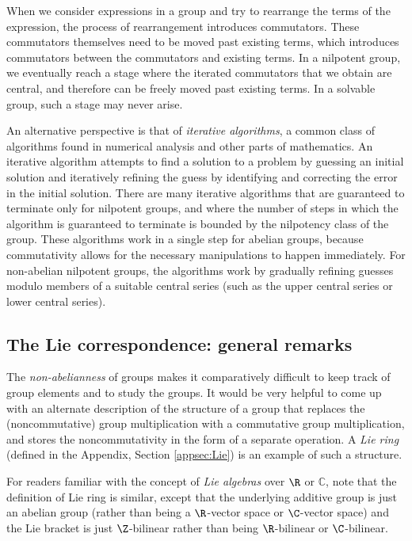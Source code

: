 \documentclass{ucetd}
\begin{document}
When we consider expressions in a group and try to rearrange the terms
of the expression, the process of rearrangement introduces
commutators. These commutators themselves need to be moved past
existing terms, which introduces commutators between the commutators
and existing terms. In a nilpotent group, we eventually reach a stage
where the iterated commutators that we obtain are central, and
therefore can be freely moved past existing terms. In a solvable
group, such a stage may never arise.

An alternative perspective is that of {\em iterative algorithms}, a
common class of algorithms found in numerical analysis and other parts
of mathematics. An iterative algorithm attempts to find a solution to
a problem by guessing an initial solution and iteratively refining
the guess by identifying and correcting the error in the initial
solution. There are many iterative algorithms that are guaranteed to
terminate only for nilpotent groups, and where the number of steps in
which the algorithm is guaranteed to terminate is bounded by the
nilpotency class of the group. These algorithms work in a single step
for abelian groups, because commutativity allows for the necessary
manipulations to happen immediately. For non-abelian nilpotent groups,
the algorithms work by gradually refining guesses modulo members of a
suitable central series (such as the upper central series or lower
central series).

\subsection{The Lie correspondence: general remarks}\label{sec:lie-correspondence-intro}

The {\em non-abelianness} of groups makes it comparatively difficult
to keep track of group elements and to study the groups. It would be
very helpful to come up with an alternate description of the structure
of a group that replaces the (noncommutative) group multiplication
with a commutative group multiplication, and stores the
noncommutativity in the form of a separate operation. A {\em Lie ring}
(defined in the Appendix, Section \ref{appsec:Lie}) is an example of
such a structure.

For readers familiar with the concept of {\em Lie algebras} over $\R$
or $\mathbb{C}$, note that the definition of Lie ring is similar,
except that the underlying additive group is just an abelian group
(rather than being a $\R$-vector space or $\C$-vector space) and the
Lie bracket is just $\Z$-bilinear rather than being $\R$-bilinear or
$\C$-bilinear.
\end{document}
